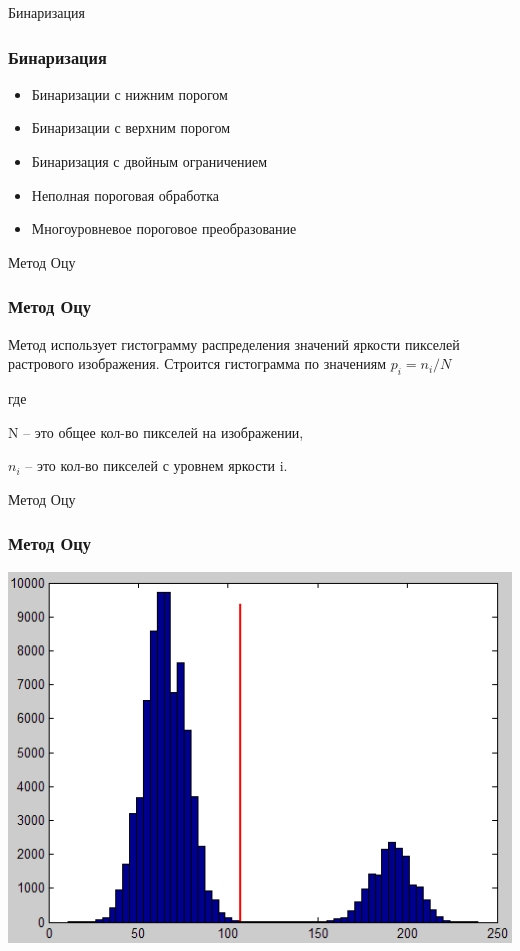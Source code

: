 \documentclass{beamer}
\begin{document}
\begin{frame}{Бинаризация}
\frametitle{Бинаризация}
 \begin{center}
	\begin{itemize}
		\item Бинаризации с нижним порогом
 		\item Бинаризации с верхним порогом
  		\item Бинаризация с двойным ограничением
  		\item Неполная пороговая обработка
  		\item Многоуровневое пороговое преобразование
	\end{itemize}
 \end{center}
\end{frame}


\begin{frame}{Метод Оцу}
\frametitle{Метод Оцу}
  Метод использует гистограмму распределения значений яркости пикселей растрового изображения. Строится гистограмма по значениям 		  $p_{i} = n_{i} / N$
  
  где 
  
  N – это общее кол-во пикселей на изображении, 
  
  $n_{i}$ – это кол-во пикселей с уровнем яркости i. 
\end{frame}




\begin{frame}{Метод Оцу}
\frametitle{Метод Оцу}
 \begin{center}
  \includegraphics[width= 0.8\linewidth]{images/gist.png}  
 \end{center}
\end{frame}
\end{document}
